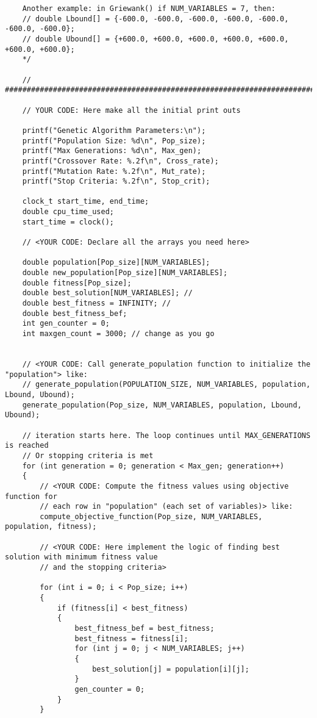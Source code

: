 \documentclass[12pt]{article}
\begin{document}
\begin{lstlisting}
    Another example: in Griewank() if NUM_VARIABLES = 7, then:
    // double Lbound[] = {-600.0, -600.0, -600.0, -600.0, -600.0, -600.0, -600.0};
    // double Ubound[] = {+600.0, +600.0, +600.0, +600.0, +600.0, +600.0, +600.0};
    */

    // ###################################################################################

    // YOUR CODE: Here make all the initial print outs

    printf("Genetic Algorithm Parameters:\n");
    printf("Population Size: %d\n", Pop_size);
    printf("Max Generations: %d\n", Max_gen);
    printf("Crossover Rate: %.2f\n", Cross_rate);
    printf("Mutation Rate: %.2f\n", Mut_rate);
    printf("Stop Criteria: %.2f\n", Stop_crit);

    clock_t start_time, end_time;
    double cpu_time_used;
    start_time = clock();

    // <YOUR CODE: Declare all the arrays you need here>

    double population[Pop_size][NUM_VARIABLES];
    double new_population[Pop_size][NUM_VARIABLES];
    double fitness[Pop_size];
    double best_solution[NUM_VARIABLES]; //
    double best_fitness = INFINITY; // 
    double best_fitness_bef;
    int gen_counter = 0;
    int maxgen_count = 3000; // change as you go


    // <YOUR CODE: Call generate_population function to initialize the "population"> like:
    // generate_population(POPULATION_SIZE, NUM_VARIABLES, population, Lbound, Ubound);
    generate_population(Pop_size, NUM_VARIABLES, population, Lbound, Ubound);

    // iteration starts here. The loop continues until MAX_GENERATIONS is reached
    // Or stopping criteria is met
    for (int generation = 0; generation < Max_gen; generation++)
    {
        // <YOUR CODE: Compute the fitness values using objective function for
        // each row in "population" (each set of variables)> like:
        compute_objective_function(Pop_size, NUM_VARIABLES, population, fitness);

        // <YOUR CODE: Here implement the logic of finding best solution with minimum fitness value
        // and the stopping criteria>

        for (int i = 0; i < Pop_size; i++)
        {
            if (fitness[i] < best_fitness)
            {
                best_fitness_bef = best_fitness;
                best_fitness = fitness[i];
                for (int j = 0; j < NUM_VARIABLES; j++)
                {
                    best_solution[j] = population[i][j];
                }
                gen_counter = 0;
            }
        }


\end{lstlisting}
\end{document}
